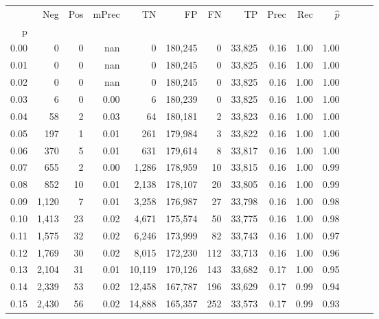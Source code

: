 \begin{tabular}{rrrrrrrrrrrrrr}
\toprule
{} &    Neg &  Pos & mPrec &       TN &       FP &      FN &      TP &  Prec &   Rec & $\hat{p}$ \\
p    &        &      &       &          &          &         &         &       &       &           \\
\midrule
0.00 &      0 &    0 &   nan &        0 &  180,245 &       0 &  33,825 &  0.16 &  1.00 &      1.00 \\
0.01 &      0 &    0 &   nan &        0 &  180,245 &       0 &  33,825 &  0.16 &  1.00 &      1.00 \\
0.02 &      0 &    0 &   nan &        0 &  180,245 &       0 &  33,825 &  0.16 &  1.00 &      1.00 \\
0.03 &      6 &    0 &  0.00 &        6 &  180,239 &       0 &  33,825 &  0.16 &  1.00 &      1.00 \\
0.04 &     58 &    2 &  0.03 &       64 &  180,181 &       2 &  33,823 &  0.16 &  1.00 &      1.00 \\
0.05 &    197 &    1 &  0.01 &      261 &  179,984 &       3 &  33,822 &  0.16 &  1.00 &      1.00 \\
0.06 &    370 &    5 &  0.01 &      631 &  179,614 &       8 &  33,817 &  0.16 &  1.00 &      1.00 \\
0.07 &    655 &    2 &  0.00 &    1,286 &  178,959 &      10 &  33,815 &  0.16 &  1.00 &      0.99 \\
0.08 &    852 &   10 &  0.01 &    2,138 &  178,107 &      20 &  33,805 &  0.16 &  1.00 &      0.99 \\
0.09 &  1,120 &    7 &  0.01 &    3,258 &  176,987 &      27 &  33,798 &  0.16 &  1.00 &      0.98 \\
0.10 &  1,413 &   23 &  0.02 &    4,671 &  175,574 &      50 &  33,775 &  0.16 &  1.00 &      0.98 \\
0.11 &  1,575 &   32 &  0.02 &    6,246 &  173,999 &      82 &  33,743 &  0.16 &  1.00 &      0.97 \\
0.12 &  1,769 &   30 &  0.02 &    8,015 &  172,230 &     112 &  33,713 &  0.16 &  1.00 &      0.96 \\
0.13 &  2,104 &   31 &  0.01 &   10,119 &  170,126 &     143 &  33,682 &  0.17 &  1.00 &      0.95 \\
0.14 &  2,339 &   53 &  0.02 &   12,458 &  167,787 &     196 &  33,629 &  0.17 &  0.99 &      0.94 \\
0.15 &  2,430 &   56 &  0.02 &   14,888 &  165,357 &     252 &  33,573 &  0.17 &  0.99 &      0.93 \\

\end{tabular}
